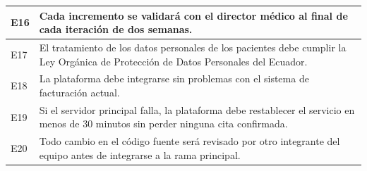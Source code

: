 \documentclass[11pt]{article}
\begin{document}
{\begin{longtable}{|>{\centering\arraybackslash}p{1.5cm}|p{\dimexpr\textwidth-1.5cm-4\tabcolsep-3\arrayrulewidth\relax}|}
	E16 & Cada incremento se validará con el director médico al final de cada iteración de dos semanas. \\ \hline
	E17 & El tratamiento de los datos personales de los pacientes debe cumplir la Ley Orgánica de Protección de Datos Personales del Ecuador. \\ \hline
	E18 & La plataforma debe integrarse sin problemas con el sistema de facturación actual. \\ \hline
	E19 & Si el servidor principal falla, la plataforma debe restablecer el servicio en menos de 30 minutos sin perder ninguna cita confirmada. \\ \hline
	E20 & Todo cambio en el código fuente será revisado por otro integrante del equipo antes de integrarse a la rama principal. \\ \hline
\end{longtable}
}



\end{document}
